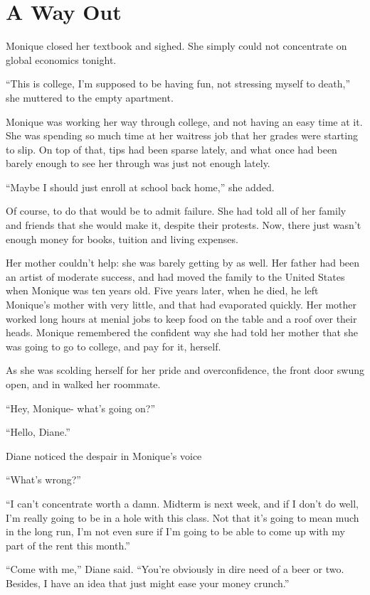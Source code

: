 \chapter{A Way Out}
    Monique closed her textbook and sighed. She simply could not concentrate on global economics
tonight.

``This is college, I'm supposed to be having fun, not stressing myself to death,'' she muttered
to the empty apartment.

Monique was working her way through college, and not having an easy time at it. She was spending
so much time at her waitress job that her grades were starting to slip. On top of that, tips had
been sparse lately, and what once had been barely enough to see her through was just not enough
lately.

``Maybe I should just enroll at school back home,'' she added.

Of course, to do that would be to admit failure. She had told all of her family and friends that
she would make it, despite their protests. Now, there just wasn't enough money for books,
tuition and living expenses.

Her mother couldn't help: she was barely getting by as well. Her father had been an artist of
moderate success, and had moved the family to the United States when Monique was ten years old.
Five years later, when he died, he left Monique's mother with very little, and that had
evaporated quickly. Her mother worked long hours at menial jobs to keep food on the table and a
roof over their heads. Monique remembered the confident way she had told her mother that she was
going to go to college, and pay for it, herself.

As she was scolding herself for her pride and overconfidence, the front door swung open, and in
walked her roommate.

``Hey, Monique- what's going on?''

``Hello, Diane.''

Diane noticed the despair in Monique's voice

``What's wrong?''

``I can't concentrate worth a damn. Midterm is next week, and if I don't do well, I'm really
going to be in a hole with this class. Not that it's going to mean much in the long run, I'm not
even sure if I'm going to be able to come up with my part of the rent this month.''

``Come with me,'' Diane said. ``You're obviously in dire need of a beer or two. Besides, I have
an idea that just might ease your money crunch.''

